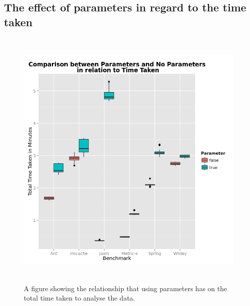 \documentclass[11pt
              , a4paper
              , twoside
              , openright
              ]{report}
\begin{document}
\begin{appendices}
\chapter{The effect of parameters in regard to the time taken}
\begin{figure}[h]
\centering
\includegraphics[width=\textwidth,height=13cm]{ParamTime.png}
\caption{A figure showing the relationship that using parameters has on the total time taken to analyse the data.}
\label{fig:paramtime}
\end{figure}


\end{appendices}
\end{document}
